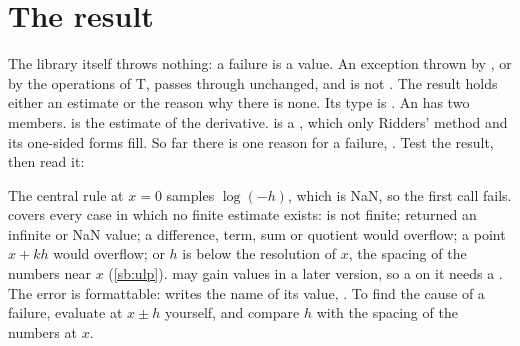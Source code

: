 \section{The result}\label{sec:using-result}

The library itself throws nothing: a failure is a value. An exception thrown by , or by the operations of T,
passes through unchanged, and  is not . The result holds either an estimate or the
reason why there is none. Its type is . An  has two
members.  is the estimate of the derivative.  is a , which only
Ridders' method and its one-sided forms fill. So far there is one reason for a failure, .
Test the result, then read it:

The central rule at $x = 0$ samples $\log(-h)$, which is NaN, so the first call fails. 
covers every case in which no finite estimate exists:  is not finite;  returned an infinite or NaN
value; a difference, term, sum or quotient would overflow; a point $x + k h$ would overflow; or $h$ is below the
resolution of $x$, the spacing of the numbers near $x$ (\cref{sb:ulp}).  may gain values in a later
version, so a  on it needs a . The error is formattable:
 writes the name of its value, . To find the cause of a failure,
evaluate  at $x \pm h$ yourself, and compare $h$ with the spacing of the numbers at $x$.

